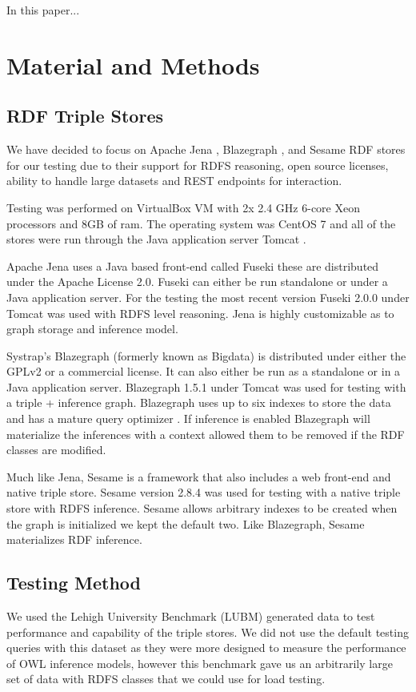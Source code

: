 \documentclass{llncs}
\begin{document}
In this paper...

\section{Material and Methods}
\subsection{RDF Triple Stores}

We have decided to focus on Apache Jena \cite{Jena}, Blazegraph \cite{Blazegraph}, and Sesame \cite{Sesame} RDF stores for our testing due to their support for RDFS reasoning, open source licenses, ability to handle large datasets and REST endpoints for interaction. \cite{Voigt2012}

Testing was performed on VirtualBox VM \cite{Virtualbox} with 2x 2.4 GHz 6-core Xeon processors and 8GB of ram.  The operating system was CentOS 7 \cite{Centos} and all of the stores were run through the Java application server Tomcat \cite{Tomcat}.

Apache Jena uses a Java based front-end called Fuseki these are distributed under the Apache License 2.0.  Fuseki can either be run standalone or under a Java application server.  For the testing the most recent version Fuseki 2.0.0 under Tomcat was used with RDFS level reasoning.  Jena is highly customizable as to graph storage and inference model.

Systrap's Blazegraph (formerly known as Bigdata) is distributed under either the GPLv2 or a commercial license.  It can also either be run as a standalone or in a Java application server.  Blazegraph 1.5.1 under Tomcat was used for testing with a triple + inference graph.  Blazegraph uses up to six indexes to store the data and has a mature query optimizer \cite{RDFDatabaseSystems}.  If inference is enabled Blazegraph will materialize the inferences with a context allowed them to be removed if the RDF classes are modified.

Much like Jena, Sesame is a framework that also includes a web front-end and native triple store.  Sesame version 2.8.4 was used for testing with a native triple store with RDFS inference.  Sesame allows arbitrary indexes to be created when the graph is initialized we kept the default two.  Like Blazegraph, Sesame materializes RDF inference.

\subsection{Testing Method}
We used the Lehigh University Benchmark (LUBM) \cite{Guo2005} generated data to test performance and capability of the triple stores.  We did not use the default testing queries with this dataset as they were more designed to measure the performance of OWL inference models, however this benchmark gave us an arbitrarily large set of data with RDFS classes that we could use for load testing.
\end{document}
